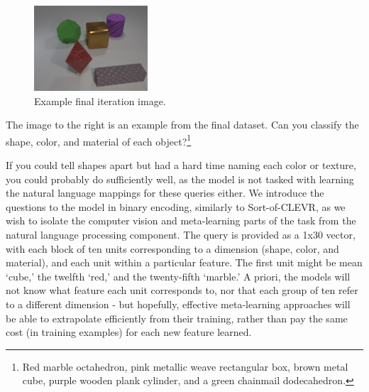 \begin{figure}
\vspace{-.2in}
\begin{spacing}{1.0}
\centering
\includegraphics[width=.95\linewidth]{ch-dataset-task-benchmark/figures/dataset/final_image.png}
\caption{Example final iteration image.}
\label{fig:dataset-final-image}
\end{spacing}
\end{figure}

The image to the right is an example from the final dataset. Can you classify the shape, color, and material of each object?\footnote{Red marble octahedron, pink metallic weave rectangular box, brown metal cube, purple wooden plank cylinder, and a green chainmail dodecahedron.}

If you could tell shapes apart but had a hard time naming each color or texture, you could probably do sufficiently well, as the model is not tasked with learning the natural language mappings for these queries either. We introduce the questions to the model in binary encoding, similarly to Sort-of-CLEVR, as we wish to isolate the computer vision and meta-learning parts of the task from the natural language processing component. The query is provided as a 1x30 vector, with each block of ten units corresponding to a dimension (shape, color, and material), and each unit within a particular feature. The first unit might be mean `cube,' the twelfth `red,' and the twenty-fifth `marble.' A priori, the models will not know what feature each unit corresponds to, nor that each group of ten refer to a different dimension - but hopefully, effective meta-learning approaches will be able to extrapolate efficiently from their training, rather than pay the same cost (in training examples) for each new feature learned.  

